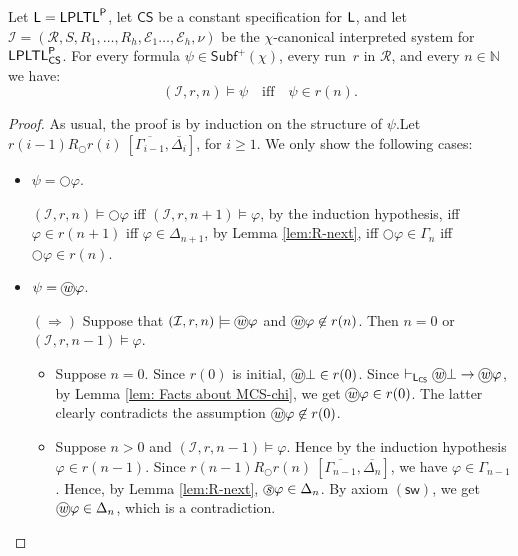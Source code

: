 \documentclass[envcountsect,envcountsame,oribibl,orivec]{llncs}
\newcommand*\circled[1]{\tikz[baseline=(char.base)]{
		\node[shape=circle,draw,inner sep=0.4pt] (char) {#1};}}
\newcommand{\lnext}{\bigcirc}
\newcommand{\lsince}{{\,\mathcal{S}\,}}
\newcommand{\wprevious}{\circled{\textit{w}}}
\newcommand{\sprevious}{\circled{\textit{s}}}
\newcommand{\swprevax}{\ensuremath{(\textsf{sw})}}
\newcommand{\LPLTLp}{\textsf{LPLTL}^{\sf P}}
\newcommand{\CS}{\textsf{CS}}
\newcommand{\numberofagents}{h}
\newcommand{\runs}{\mathcal{R}}
\newcommand{\system}{\mathcal{I}}
\newcommand{\evidence}{\mathcal{E}}
\newcommand{\valuation}{\nu}
\newcommand{\N}{\mathbb{N}}
\renewcommand{\phi}{\varphi}
\newcommand{\Subf}{\mathsf{Subf}}
\newcommand{\RO}[4]{#1 R_\lnext #2\ [#3, #4]}
\begin{document}
\begin{lemma}\label{lem:Truth Lemma LPLTL}
	Let $\mathsf{L} = \LPLTLp$, let $\CS$ be a constant specification for ${\sf L}$, and let
	$
	\system = (\runs, S, R_1,\ldots,R_\numberofagents, \evidence_1\ldots,\evidence_\numberofagents, \valuation)
	$ 
	be the $\chi$-canonical interpreted system for~$\LPLTLp_\CS$. For every formula $\psi \in  \Subf^+(\chi)$, every run~$r$ in $\runs$, and every $n \in \N$ we have:
	\[
	(\system, r, n) \models \psi 
	\quad\text{if{f}}\quad
	\psi \in r(n).
	\]
\end{lemma}
\begin{proof}
	As usual, the proof is by induction on the structure of $\psi$.\linebreak Let $\RO{r(i-1)}{r(i)}{\overline{\Gamma_{i-1}}}{\overline{\Delta_{i}}}$, for $i \geq 1$. We only show the following cases:%
	\begin{itemize}
		\item $\psi = \lnext \phi$.
		
		$(\system, r, n) \models \lnext \phi$ if{f} $(\system, r, n+1) \models \phi$, by the induction hypothesis, if{f} $\phi \in r(n+1)$ if{f} $\phi \in \Delta_{n+1}$, by Lemma \ref{lem:R-next}, if{f} $\lnext \phi \in \Gamma_{n}$ if{f} $\lnext \phi \in r(n)$.
		
		\item $\psi = \wprevious \phi$.
		
		$(\Rightarrow)$ Suppose that $(\system, r, n) \models \wprevious \phi$ and $\wprevious \phi \not\in r(n)$.  Then $n=0$ or $(\system, r, n-1) \models  \phi$.
		
		\begin{itemize}
			\item Suppose $n=0$. Since $r(0)$ is initial, $\wprevious \bot \in r(0)$. Since  $\vdash_{\mathsf{L}_\CS} \wprevious \bot \rightarrow \wprevious \phi$, by Lemma \ref{lem: Facts about MCS-chi}, we get $\wprevious\phi \in r(0)$. The latter clearly contradicts the assumption  $\wprevious \phi \not\in r(0)$.
			
			\item Suppose $n>0$ and $(\system, r, n-1) \models  \phi$. Hence by the induction hypothesis $\phi \in r(n-1)$. Since $\RO{r(n-1)}{r(n)}{\overline{\Gamma_{n-1}}}{\overline{\Delta_{n}}}$, we have $\phi \in \Gamma_{n-1}$. Hence, by Lemma \ref{lem:R-next}, $\sprevious \phi \in \Delta_n$. By axiom $\swprevax$, we get   $\wprevious \phi \in \Delta_n$, which is a contradiction.
		\end{itemize}
		

\end{itemize}
\end{proof}
\end{document}
